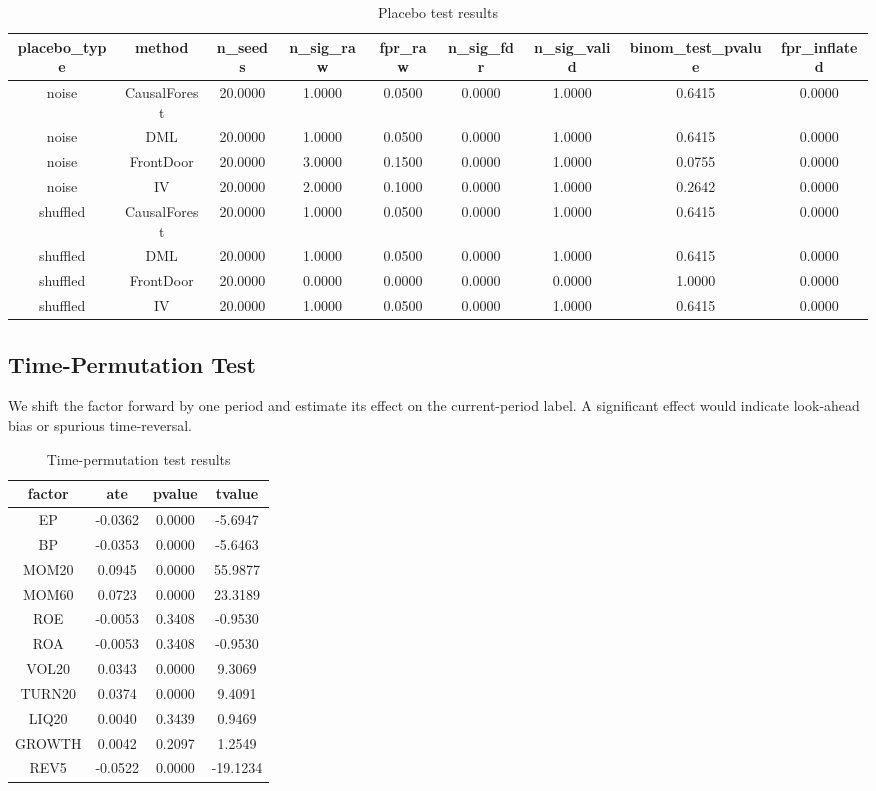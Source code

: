 \documentclass[12pt,a4paper]{article}
\begin{document}
\begin{table}[htbp]
\centering
\caption{Placebo test results}
\label{tab:placebo}
\begin{tabular}{ccccccccc}
\toprule
placebo\_type & method & n\_seeds & n\_sig\_raw & fpr\_raw & n\_sig\_fdr & n\_sig\_valid & binom\_test\_pvalue & fpr\_inflated \\ 
\midrule
noise & CausalForest & 20.0000 & 1.0000 & 0.0500 & 0.0000 & 1.0000 & 0.6415 & 0.0000 \\ 
noise & DML & 20.0000 & 1.0000 & 0.0500 & 0.0000 & 1.0000 & 0.6415 & 0.0000 \\ 
noise & FrontDoor & 20.0000 & 3.0000 & 0.1500 & 0.0000 & 1.0000 & 0.0755 & 0.0000 \\ 
noise & IV & 20.0000 & 2.0000 & 0.1000 & 0.0000 & 1.0000 & 0.2642 & 0.0000 \\ 
shuffled & CausalForest & 20.0000 & 1.0000 & 0.0500 & 0.0000 & 1.0000 & 0.6415 & 0.0000 \\ 
shuffled & DML & 20.0000 & 1.0000 & 0.0500 & 0.0000 & 1.0000 & 0.6415 & 0.0000 \\ 
shuffled & FrontDoor & 20.0000 & 0.0000 & 0.0000 & 0.0000 & 0.0000 & 1.0000 & 0.0000 \\ 
shuffled & IV & 20.0000 & 1.0000 & 0.0500 & 0.0000 & 1.0000 & 0.6415 & 0.0000 \\ 
\bottomrule
\end{tabular}
\end{table}

\subsection{Time-Permutation Test}
We shift the factor forward by one period and estimate its effect on the current-period label. A significant effect would indicate look-ahead bias or spurious time-reversal.

\begin{table}[htbp]
\centering
\caption{Time-permutation test results}
\label{tab:timeperm}
\begin{tabular}{cccc}
\toprule
factor & ate & pvalue & tvalue \\ 
\midrule
EP & -0.0362 & 0.0000 & -5.6947 \\ 
BP & -0.0353 & 0.0000 & -5.6463 \\ 
MOM20 & 0.0945 & 0.0000 & 55.9877 \\ 
MOM60 & 0.0723 & 0.0000 & 23.3189 \\ 
ROE & -0.0053 & 0.3408 & -0.9530 \\ 
ROA & -0.0053 & 0.3408 & -0.9530 \\ 
VOL20 & 0.0343 & 0.0000 & 9.3069 \\ 
TURN20 & 0.0374 & 0.0000 & 9.4091 \\ 
LIQ20 & 0.0040 & 0.3439 & 0.9469 \\ 
GROWTH & 0.0042 & 0.2097 & 1.2549 \\ 
REV5 & -0.0522 & 0.0000 & -19.1234 \\ 
\bottomrule
\end{tabular}
\end{table}
\end{document}

